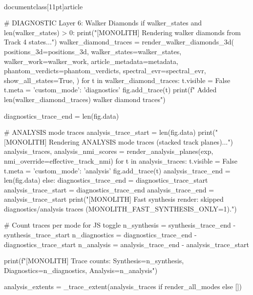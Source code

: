 \\documentclass[11pt]{article}
\begin{document}
\begin{CodeBlock}
{{{{{{        # DIAGNOSTIC Layer 6: Walker Diamonds
        if walker_states and len(walker_states) > 0:
            print("[MONOLITH] Rendering walker diamonds from Track 4 states...")
            walker_diamond_traces = render_walker_diamonds_3d(
                positions_3d=positions_3d,
                walker_states=walker_states,
                walker_work=walker_work,
                article_metadata=metadata,
                phantom_verdicts=phantom_verdicts,
                spectral_evr=spectral_evr,
                show_all_states=True,
            )
            for t in walker_diamond_traces:
                t.visible = False
                t.meta = {'custom_mode': 'diagnostics'}
                fig.add_trace(t)
            print(f"  Added {len(walker_diamond_traces)} walker diamond traces")

        diagnostics_trace_end = len(fig.data)

        # ANALYSIS mode traces
        analysis_trace_start = len(fig.data)
        print("[MONOLITH] Rendering ANALYSIS mode traces (stacked track planes)...")
        analysis_traces, analysis_nmi_scores = render_analysis_planes(exp, nmi_override=effective_track_nmi)
        for t in analysis_traces:
            t.visible = False
            t.meta = {'custom_mode': 'analysis'}
            fig.add_trace(t)
        analysis_trace_end = len(fig.data)
    else:
        diagnostics_trace_end = diagnostics_trace_start
        analysis_trace_start = diagnostics_trace_end
        analysis_trace_end = analysis_trace_start
        print("[MONOLITH] Fast synthesis render: skipped diagnostics/analysis traces (MONOLITH_FAST_SYNTHESIS_ONLY=1).")

    # Count traces per mode for JS toggle
    n_synthesis = synthesis_trace_end - synthesis_trace_start
    n_diagnostics = diagnostics_trace_end - diagnostics_trace_start
    n_analysis = analysis_trace_end - analysis_trace_start

    print(f"[MONOLITH] Trace counts: Synthesis={n_synthesis}, Diagnostics={n_diagnostics}, Analysis={n_analysis}")

    analysis_extents = _trace_extent(analysis_traces if render_all_modes else [])

}}}}}}
\end{CodeBlock}
\end{document}
